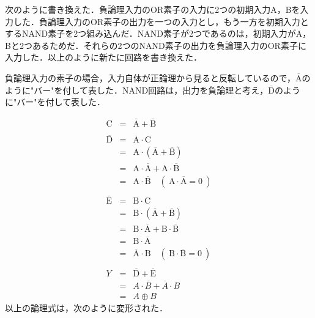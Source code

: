 次のように書き換えた．負論理入力のOR素子の入力に2つの初期入力A，Bを入力した．負論理入力のOR素子の出力を一つの入力とし，もう一方を初期入力とするNAND素子を2つ組み込んだ．NAND素子が2つであるのは，初期入力がA，Bと2つあるためだ．それらの2つのNAND素子の出力を負論理入力のOR素子に入力した．以上のように新たに回路を書き換えた．

負論理入力の素子の場合，入力自体が正論理から見ると反転しているので，$\overline{\mathrm{A}}$のように"バー"を付して表した．NAND回路は，出力を負論理と考え，$\overline{\mathrm{D}}$のように"バー"を付して表した．

\begin{eqnarray}
	\mathrm{C} 
	&=& 
		\overline{\mathrm{A}} + \overline{\mathrm{B}} 
	\label{equ_exor_c1} \\
	&&\nonumber \\
	\overline{\mathrm{D}} 
	&=&		\mathrm{A} \cdot \mathrm{C} \label{equ_exor_d1} \\
	&=& 	\mathrm{A} \cdot ( \overline{\mathrm{A}} + \overline{\mathrm{B}} ) 
	\label{equ_exor_d2} \\
	&=& 	\mathrm{A} \cdot \overline{ \mathrm{A}} 
		+	\mathrm{A} \cdot \overline{\mathrm{B}} 
	\label{equ_exor_d3} \\
	&=& \mathrm{A} \cdot \overline{\mathrm{B}} 
	\quad
	\left(~\mathrm{A} \cdot \overline{\mathrm{A}} = 0 ~\right) 
	\label{equ_exor_d4} \\
	&&\nonumber \\
	\overline{\mathrm{E}} 
	&=& 	\mathrm{B} \cdot \mathrm{C} \label{equ_exor_e1} \\
	&=& 	\mathrm{B} \cdot ( \overline{\mathrm{A}} + \overline{\mathrm{B}} ) 
	\label{equ_exor_e2} \\
	&=& 	\mathrm{B} \cdot \overline{ \mathrm{A}} + \mathrm{B} \cdot \overline{\mathrm{B}}
	\label{equ_exor_e3} \\
	&=& \mathrm{B} \cdot \overline{\mathrm{A}} 
	\label{equ_exor_e4} \\
	&=& \overline{ \mathrm{A}} \cdot \mathrm{B} 
	\quad
	\left(~\mathrm{B} \cdot \overline{\mathrm{B}} = 0 ~\right) 
	\label{equ_exor_e5} \\
	&&\nonumber \\
	Y
	&=&\overline{\mathrm{D}} + \overline{\mathrm{E}} \label{equ_exor_y1} \\
	&=& A \cdot \overline{B} + \overline{A} \cdot B \label{equ_exor_y2} \\
	&=& A\oplus B \label{equ_exor_y3} 
\end{eqnarray}
以上の論理式は，次のように変形された．
